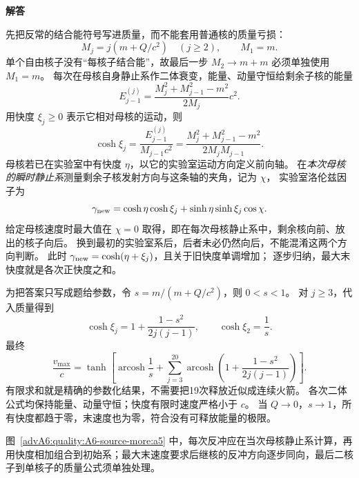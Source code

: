 \begin{advsolution}
\begin{center}\begin{minipage}{.96\linewidth}\centering
\raggedright{\bfseries\color{DeepBlue}解答}\par\smallskip\centering

\label{advA6:quality:A6-source-more:a5}
\end{minipage}\end{center}

先把反常的结合能符号写进质量，而不能套用普通核的质量亏损：
\[
 M_j=j(m+Q/c^2)\quad(j\ge2),\qquad M_1=m.
\]
单个自由核子没有“每核子结合能”，故最后一步 $M_2\to m+m$ 必须单独使用 $M_1=m$。
每次在母核自身静止系作二体衰变，能量、动量守恒给剩余子核的能量
\[
 E_{j-1}^{(j)}=\frac{M_j^2+M_{j-1}^2-m^2}{2M_j}c^2.
\]
用快度 $\xi_j\ge0$ 表示它相对母核的运动，则
\[
 \cosh\xi_j=\frac{E_{j-1}^{(j)}}{M_{j-1}c^2}
 =\frac{M_j^2+M_{j-1}^2-m^2}{2M_jM_{j-1}}.
\]
母核若已在实验室中有快度 $\eta$，以它的实验室运动方向定义前向轴。
在\emph{本次母核的瞬时静止系}测量剩余子核发射方向与这条轴的夹角，记为 $\chi$，
实验室洛伦兹因子为
\[
 \gamma_{\rm new}=\cosh\eta\cosh\xi_j
 +\sinh\eta\sinh\xi_j\cos\chi.
\]
给定母核速度时最大值在 $\chi=0$ 取得，即在每次母核静止系中，剩余核向前、放出的核子向后。
换到最初的实验室系后，后者未必仍然向后，不能混淆这两个方向判断。
此时 $\gamma_{\rm new}=\cosh(\eta+\xi_j)$，且关于旧快度单调增加；
逐步归纳，最大末快度就是各次正快度之和。

为把答案只写成题给参数，令 $s=m/(m+Q/c^2)$，则 $0<s<1$。
对 $j\ge3$，代入质量得到
\[
 \cosh\xi_j=1+\frac{1-s^2}{2j(j-1)},\qquad
 \cosh\xi_2=\frac1s.
\]
最终
\[
 \boxed{\frac{v_{\max}}c=
 \tanh\left[\operatorname{arcosh}\frac1s+
 \sum_{j=3}^{20}\operatorname{arcosh}\left(1+\frac{1-s^2}{2j(j-1)}\right)\right]}.
\]
有限求和就是精确的参数化结果，不需要把19次释放近似成连续火箭。
各次二体公式均保持能量、动量守恒；快度有限时速度严格小于 $c$。
当 $Q\to0$，$s\to1$，所有快度都趋于零，末速度也为零，符合没有可释放能量的极限。

图~\ref{advA6:quality:A6-source-more:a5} 中，每次反冲应在当次母核静止系计算，再用快度相加组合到初始系；最大末速度要求后继核的反冲方向逐步同向，最后二核子到单核子的质量公式须单独处理。
\end{advsolution}

